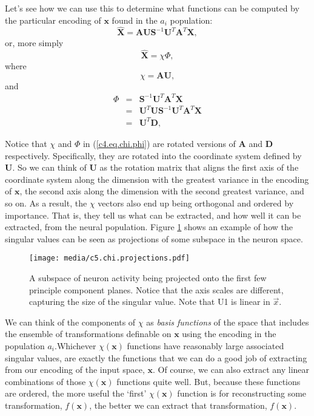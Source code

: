 \documentclass[10pt,letterpaper,oneside]{article}
\begin{document}
Let's see how we can use this to determine what functions can be computed
by the particular encoding of $\mathbf{x}$ found in the $a_{i}$
population: 
\[
\hat{\mathbf{X}}=\mathbf{AUS}^{-1}\mathbf{U}^{T}\mathbf{A}^{T}\mathbf{X},
\]
 or, more simply
\begin{equation}
\hat{\mathbf{X}}=\chi\Phi,\label{c4.eq.chi.phi}
\end{equation}
 where 
\[
\chi=\mathbf{AU},
\]
and
\begin{eqnarray*}
\Phi & = & \mathbf{S}^{-1}\mathbf{U}^{T}\mathbf{A}^{T}\mathbf{X}\\
 & = & \mathbf{U}^{T}\mathbf{US}^{-1}\mathbf{U}^{T}\mathbf{A}^{T}\mathbf{X}\\
 & = & \mathbf{U}^{T}\mathbf{D},
\end{eqnarray*}
 
Notice that $\chi$ and $\Phi$ in (\ref{c4.eq.chi.phi}) are rotated
versions of $\mathbf{A}$ and $\mathbf{D}$ respectively. Specifically,
they are rotated into the coordinate system defined by $\mathbf{U}$.
So we can think of $\mathbf{U}$ as the rotation matrix that aligns
the first axis of the coordinate system along the dimension with the
greatest variance in the encoding of $\mathbf{x}$, the second axis
along the dimension with the second greatest variance, and so on.
As a result, the $\chi$
vectors also end up being orthogonal and ordered by importance. That
is, they tell us what can be extracted, and how well it can be extracted,
from the neural population. Figure \ref{svd.projection} shows an example of how the singular values can be seen as projections of some subspace in the neuron space.

\begin{figure}[h]
  \centering
  \texttt{[image: media/c5.chi.projections.pdf]}
  \caption{A subspace of neuron activity being projected onto the first few principle component planes. Notice that the axis scales are different, capturing the size of the singular value. Note that U1 is linear in $\vec{x}$.}
	\label{svd.projection}
\end{figure}

We can think of the components of $\chi$ as \emph{basis
functions} of the space that includes the ensemble of transformations
definable on $\mathbf{x}$ using the encoding in the population $a_{i}$.Whichever $\chi(\mathbf{x})$ functions have reasonably large associated
singular values, are exactly the functions that we can do a good job
of extracting from our encoding of the input space, $\mathbf{x}$.
Of course, we can also extract any linear combinations of those $\chi(\mathbf{x})$
functions quite well. But, because these functions are ordered, the
more useful the `first' $\chi(\mathbf{x})$ function is for reconstructing
some transformation, $f(\mathbf{x})$, the better we can extract that
transformation, $f(\mathbf{x})$.
\end{document}
